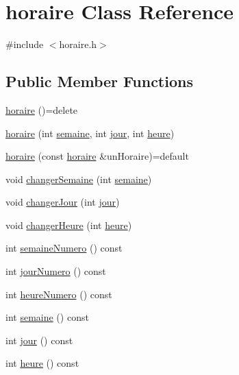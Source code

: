 \hypertarget{classhoraire}{}\section{horaire Class Reference}
\label{classhoraire}


{\ttfamily \#include $<$horaire.\+h$>$}

\subsection*{Public Member Functions}
\begin{DoxyCompactItemize}
\item 
\hyperlink{classhoraire_aa5f11a3d1a68b9ef98e6aed7e3773b29}{horaire} ()=delete
\item 
\hyperlink{classhoraire_a1a6d044450099f5e481188c4f51d41ea}{horaire} (int \hyperlink{classhoraire_ae53308a6dd6c802a5f2b21ffc93c0ed4}{semaine}, int \hyperlink{classhoraire_a974c25bda0b56a5abcfa64de32a6ccf0}{jour}, int \hyperlink{classhoraire_a3ddd3f0b63ef3c95802634d9ba072e0a}{heure})
\item 
\hyperlink{classhoraire_adbeac30f6f55e50ec7455a2bb52e7b3a}{horaire} (const \hyperlink{classhoraire}{horaire} \&un\+Horaire)=default
\item 
void \hyperlink{classhoraire_a8529f03119bbfd87a59a9efad6993f9d}{changer\+Semaine} (int \hyperlink{classhoraire_ae53308a6dd6c802a5f2b21ffc93c0ed4}{semaine})
\item 
void \hyperlink{classhoraire_a5f9db9929031e9f94460a81dccf6e273}{changer\+Jour} (int \hyperlink{classhoraire_a974c25bda0b56a5abcfa64de32a6ccf0}{jour})
\item 
void \hyperlink{classhoraire_ac4685ee68148ad0d2200f8f188ea1b69}{changer\+Heure} (int \hyperlink{classhoraire_a3ddd3f0b63ef3c95802634d9ba072e0a}{heure})
\item 
int \hyperlink{classhoraire_a856d1830c70ff94ebdbaa6c6dcbe6347}{semaine\+Numero} () const
\item 
int \hyperlink{classhoraire_a958470c23ace8be3f5b93aab1183ade3}{jour\+Numero} () const
\item 
int \hyperlink{classhoraire_a0acafcfdbd8f9bef79e1cdf9fac128fb}{heure\+Numero} () const
\item 
int \hyperlink{classhoraire_ae53308a6dd6c802a5f2b21ffc93c0ed4}{semaine} () const
\item 
int \hyperlink{classhoraire_a974c25bda0b56a5abcfa64de32a6ccf0}{jour} () const
\item 
int \hyperlink{classhoraire_a3ddd3f0b63ef3c95802634d9ba072e0a}{heure} () const

\end{DoxyCompactItemize}
